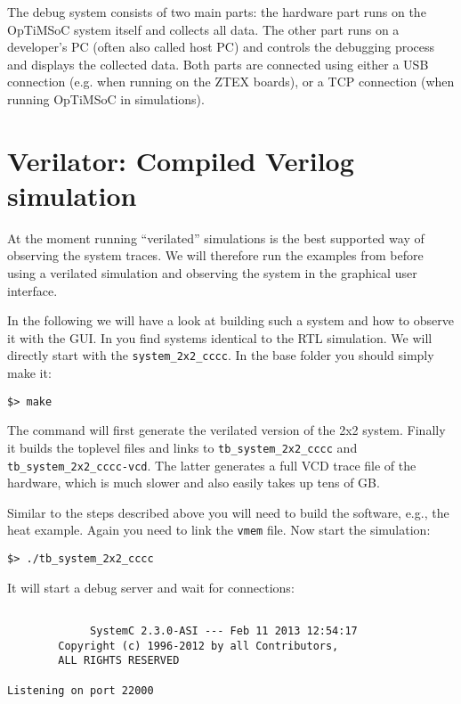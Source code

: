 The debug system consists of two main parts: the hardware part runs on the
OpTiMSoC system itself and collects all data. The other part runs on a
developer's PC (often also called host PC) and controls the debugging process
and displays the collected data. Both parts are connected using either a USB
connection (e.g. when running on the ZTEX boards), or a TCP connection (when
running OpTiMSoC in simulations).

\section{Verilator: Compiled Verilog simulation}

At the moment running ``verilated'' simulations is the best supported
way of observing the system traces. We will therefore run the examples
from before using a verilated simulation and observing the system in
the graphical user interface.

In the following we will have a look at building such a system and how
to observe it with the GUI. In  you find
systems identical to the RTL simulation. We will directly start with
the \verb|system_2x2_cccc|. In the base folder you should simply make
it:

\begin{lstlisting}
$> make
\end{lstlisting}

The command will first generate the verilated version of the 2x2
system. Finally it builds the toplevel files and links to
\verb|tb_system_2x2_cccc| and \verb|tb_system_2x2_cccc-vcd|. The
latter generates a full VCD trace file of the hardware, which is
much slower and also easily takes up tens of GB.

Similar to the steps described above you will need to build the
software, e.g., the heat example. Again you need to link the
\verb|vmem| file. Now start the simulation:

\begin{lstlisting}
$> ./tb_system_2x2_cccc
\end{lstlisting}

It will start a debug server and wait for connections:

\begin{lstlisting}

             SystemC 2.3.0-ASI --- Feb 11 2013 12:54:17
        Copyright (c) 1996-2012 by all Contributors,
        ALL RIGHTS RESERVED

Listening on port 22000
\end{lstlisting}

